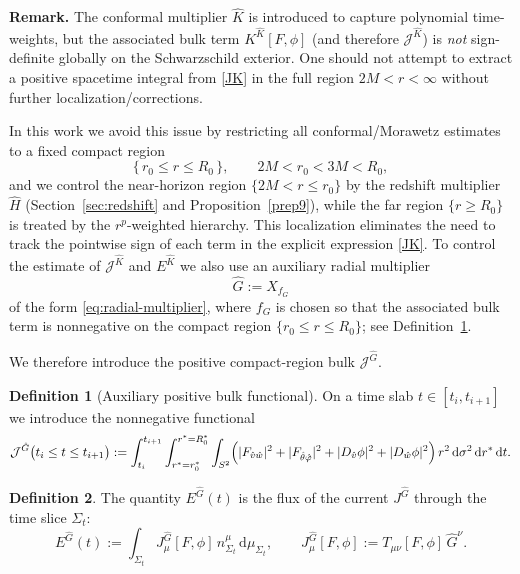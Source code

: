\documentclass[11pt]{article}
\numberwithin{equation}{section}
\theoremstyle{plain}
\theoremstyle{definition}
\newtheorem{definition}{Definition}[section]
\theoremstyle{remark}
\newcommand{\dd}{\mathrm{d}}
\begin{document}
\medskip
\noindent\textbf{Remark.}
The conformal multiplier $\hat K$ is introduced to capture polynomial time-weights, but the associated bulk term $K^{\hat K}[F,\phi]$ (and therefore $\mathcal J^{\hat K}$) is \emph{not} sign-definite globally on the Schwarzschild exterior. One should not attempt to extract a positive spacetime integral from \eqref{JK} in the full region $2M<r<\infty$ without further localization/corrections.

In this work we avoid this issue by restricting all conformal/Morawetz estimates to a fixed compact region
\begin{equation}
\{\,r_0\le r\le R_0\,\},\qquad 2M<r_0<3M<R_0,
\end{equation}
and we control the near-horizon region $\{2M<r\le r_0\}$ by the redshift multiplier $\hat H$ (Section~\ref{sec:redshift} and Proposition~\ref{prep9}), while the far region $\{r\ge R_0\}$ is treated by the $r^{p}$-weighted hierarchy. This localization eliminates the need to track the pointwise sign of each term in the explicit expression \eqref{JK}.
\medskip
To control the estimate of $\mathcal{J}^{\hat{K}}$ and $E^{\hat{K}}$ we also use an auxiliary radial multiplier
\begin{equation}
\hat G:=X_{f_{G}}
\end{equation}
of the form \eqref{eq:radial-multiplier}, where $f_{G}$ is chosen so that the associated bulk term is nonnegative on the compact region $\{r_{0}\le r\le R_{0}\}$; see Definition~\ref{def:JG}.

We therefore introduce the positive compact-region bulk $\mathcal{J}^{\hat{G}}$.
\begin{definition}[Auxiliary positive bulk functional]\label{def:JG}
On a time slab $t\in[t_i,t_{i+1}]$ we introduce the nonnegative functional
\begin{equation}\label{eq:JG-functional}
\mathcal{J}^{\hat{G}}\bigl(t_i\le t\le t_{i+1}\bigr)
:=
\int_{t_i}^{t_{i+1}}
\int_{r^{\ast}=r_{0}^{\ast}}^{r^{\ast}=R_{0}^{\ast}}
\int_{S^{2}}
\Bigl(
|F_{\hat v\hat w}|^{2}
+|F_{\hat\theta\hat\varphi}|^{2}
+|D_{\hat v}\phi|^{2}
+|D_{\hat w}\phi|^{2}
\Bigr)\,r^{2}\,\dd\sigma^{2}\,\dd r^{\ast}\,\dd t.
\end{equation}
\end{definition}

\begin{definition}
The quantity $E^{\hat G}(t)$ is the flux of the current $J^{\hat G}$ through the time slice $\Sigma_t$:
\begin{equation}\label{defEG}
E^{\hat G}(t)
:=
\int_{\Sigma_t} J_\mu^{\hat G}[F,\phi]\,n_{\Sigma_t}^{\mu}\,\dd\mu_{\Sigma_t},
\qquad
J_\mu^{\hat G}[F,\phi]:=T_{\mu\nu}[F,\phi]\,\hat G^{\nu}.
\end{equation}
\end{definition}
\end{document}
